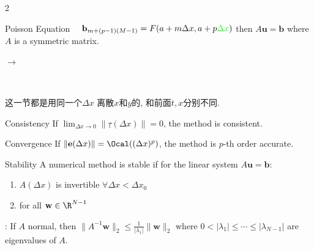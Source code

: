 \documentclass{note}
\begin{document}
\begin{multicols}{2}
{{\begin{MyTh}{Poisson Equation}
        \qquad \quad \ \ $\mathbf{b}_{m+(p-1)(M-1)}=F(a+m\Delta x, a+p\textcolor{green}{\Delta x})$ then $A\mathbf{u}=\mathbf{b}$ where $A$ is a symmetric matrix.

        \qquad $\to$ 

        \qquad \quad \ \ 
    \end{MyTh}

    \vspace{1pt}
    \begin{MyTh}{} \tiny
        这一节都是用同一个$\Delta x$ 离散$x$和$y$的, 和前面$t,x$分别不同.
    \end{MyTh}


    \begin{MyTh}{Consistency} \tiny
        If $\lim_{\Delta x\to 0}\|\underline{\tau}(\Delta x)\|=0$, the method is consistent. 
    \end{MyTh}

    \begin{MyTh}{Convergence} \tiny
        If $\|\mathbf{e}(\Delta x)\|=\Ocal((\Delta x)^p)$, the method is $p$-th order accurate.
    \end{MyTh}

    \begin{MyTh}{Stability} \tiny
        A numerical method is stable if for the linear system $A\mathbf{u}=\mathbf{b}$:

        \vspace{-2pt}
        \begin{enumerate}
            \item $A(\Delta x)$ is invertible $\forall \Delta x<\Delta x_0$
            \vspace{-2pt}
            \item {} \quad for all $\mathbf{w}\in\R^{N-1}$
        \end{enumerate}

        : If $A$ normal, then $\|A^{-1}\mathbf{w}\|_2 \leq \frac{1}{|\lambda_1|}\|\mathbf{w}\|_2$ where $0<|\lambda_1|\leq\cdots\leq|\lambda_{N-1}|$ are eigenvalues of $A$.
    \end{MyTh}

}}
\end{multicols}
\end{document}

